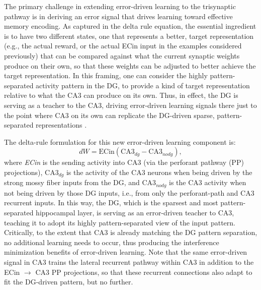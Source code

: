 \documentclass[11pt,twoside]{article}
\newif\myifpdf
\begin{document}
The primary challenge in extending error-driven learning to the trisynaptic pathway is in deriving an error signal that drives learning toward effective memory encoding.  As captured in the delta rule equation, the essential ingredient is to have two different states, one that represents a better, target representation (e.g., the actual reward, or the actual ECin input in the examples considered previously) that can be compared against what the current synaptic weights produce on their own, so that these weights can be adjusted to better achieve the target representation.  In this framing, one can consider the highly pattern-separated activity pattern in the DG, to provide a kind of target representation relative to what the CA3 can produce on its own.  Thus, in effect, the DG is serving as a teacher to the CA3, driving error-driven learning signals there just to the point where CA3 on its own can replicate the DG-driven sparse, pattern-separated representations \citep{KowadloAhmedRawlinson20}.

The delta-rule formulation for this new error-driven learning component is:
\begin{equation}
dW = \mbox{ECin} (\mbox{CA3}_{dg} - \mbox{CA3}_{nodg}),
\end{equation}
where \emph{ECin} is the sending activity into CA3 (via the perforant pathway (PP) projections), $\mbox{CA3}_{dg}$ is the activity of the CA3 neurons when being driven by the strong mossy fiber inputs from the DG, and $\mbox{CA3}_{nodg}$ is the CA3 activity when not being driven by those DG inputs, i.e., from only the perforant-path and CA3 recurrent inputs.  In this way, the DG, which is the sparsest and most pattern-separated hippocampal layer, is serving as an error-driven teacher to CA3, teaching it to adopt its highly pattern-separated view of the input pattern.  Critically, to the extent that CA3 is already matching the DG pattern separation, no additional learning needs to occur, thus producing the interference minimization benefits of error-driven learning.  Note that the same error-driven signal in CA3 trains the lateral recurrent pathway within CA3 in addition to the ECin $\rightarrow$ CA3 PP projections, so that these recurrent connections also adapt to fit the DG-driven pattern, but no further.
\end{document}
